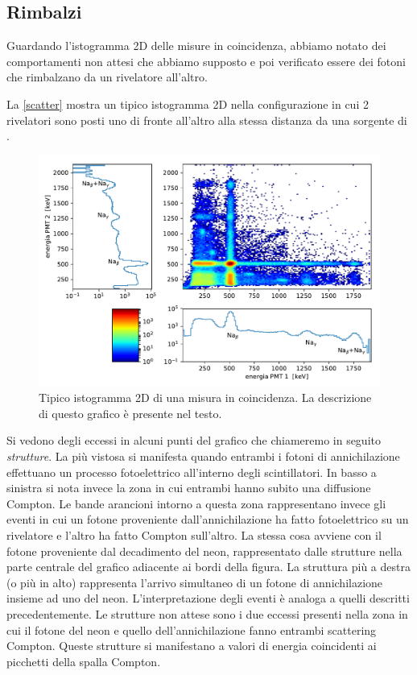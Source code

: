 \subsection{Rimbalzi}

Guardando l'istogramma 2D delle misure in coincidenza, abbiamo notato dei comportamenti non attesi che abbiamo supposto e poi verificato essere dei fotoni che rimbalzano da un rivelatore all'altro.

La \autoref{scatter} mostra un tipico istogramma 2D
nella configurazione in cui 2 rivelatori sono posti uno di fronte all'altro alla stessa distanza da una sorgente di \na{}.

\begin{figure}[h]
\centering
\includegraphics[width=\textwidth]{immagini/esempio}
\caption{Tipico istogramma 2D di una misura in coincidenza. La descrizione di questo grafico è presente nel testo.}
\label{scatter}
\end{figure}

Si vedono degli eccessi in alcuni punti del grafico che chiameremo in seguito \emph{strutture}. La più vistosa si manifesta quando entrambi i fotoni di annichilazione effettuano un processo fotoelettrico all'interno degli scintillatori. In basso a sinistra si nota invece la zona in cui entrambi hanno subito una diffusione Compton. Le bande arancioni intorno a questa zona rappresentano invece gli eventi in cui un fotone proveniente dall'annichilazione ha fatto fotoelettrico su un rivelatore e l'altro ha fatto Compton sull'altro.
La stessa cosa avviene con il fotone proveniente dal decadimento del neon, rappresentato dalle strutture nella parte centrale del grafico adiacente ai bordi della figura. La struttura più a destra (o più in alto) rappresenta l'arrivo simultaneo di un fotone di annichilazione insieme ad uno del neon. L'interpretazione degli eventi è analoga a quelli descritti precedentemente.
Le strutture non attese sono i due eccessi presenti nella zona in cui il fotone del neon e quello dell'annichilazione fanno entrambi scattering Compton. Queste strutture si manifestano a valori di energia coincidenti ai picchetti della spalla Compton.

